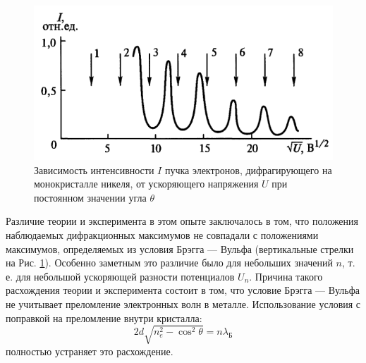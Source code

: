 \begin{figure}[H]
	\centering
	\includegraphics[width=0.6\linewidth]{img/oral-05/devison-djermer-intensivnost-u}
	\caption{Зависимость интенсивности $I$ пучка электронов, дифрагирующего на монокристалле никеля, от ускоряющего напряжения $U$ при постоянном значении угла $\theta$}
	\label{fig:devison-djermer-intensivnost-u}
\end{figure}
Различие теории и эксперимента в этом опыте заключалось в том, что положения наблюдаемых дифракционных максимумов не совпадали с положениями максимумов, определяемых из условия Брэгга — Вульфа (вертикальные стрелки на Рис. \ref{fig:devison-djermer-intensivnost-u}). Особенно заметным это различие было для небольших значений $n$, т. е. для небольшой ускоряющей разности потенциалов $U_n$. Причина такого расхождения теории и эксперимента состоит в том, что условие Брэгга — Вульфа не учитывает преломление электронных волн в металле. 
Использование условия с поправкой на преломление внутри кристалла:
\begin{equation*}
	2d\sqrt{n_e^2-\cos^2\theta}=n\lambda_{\text{Б}}
\end{equation*}
полностью устраняет это расхождение.

